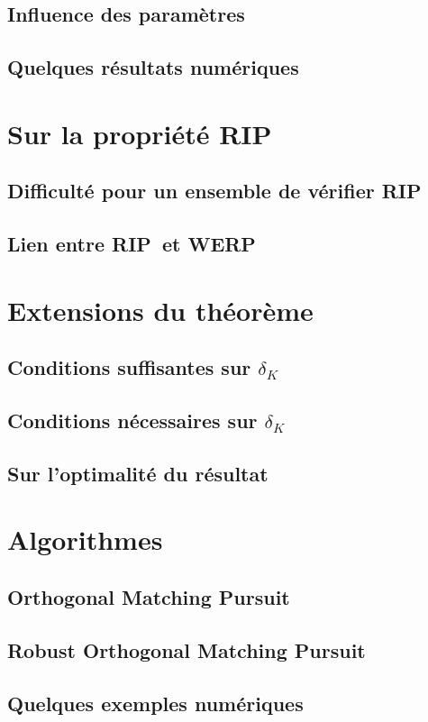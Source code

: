 \subsection{Influence des paramètres}
\subsection{Quelques résultats numériques}

\section{Sur la propriété RIP}
\subsection{Difficulté pour un ensemble de vérifier RIP}
\subsection{Lien entre \textbf{RIP} et \textbf{WERP}}

\section{Extensions du théorème}
\subsection{Conditions suffisantes sur $\delta_K$}
\subsection{Conditions nécessaires sur $\delta_K$}
\subsection{Sur l'optimalité du résultat}

\section{Algorithmes}
\subsection{Orthogonal Matching Pursuit}
\subsection{Robust Orthogonal Matching Pursuit}
\subsection{Quelques exemples numériques}

